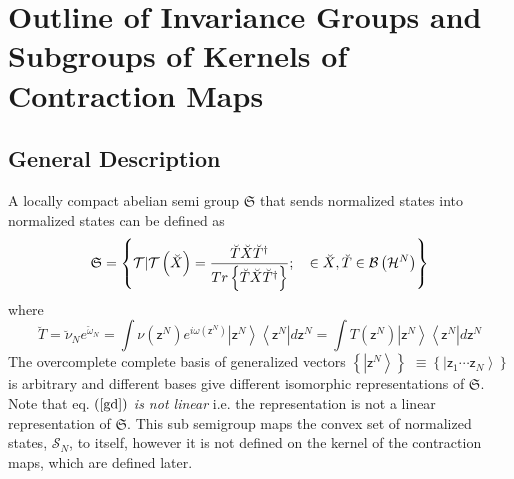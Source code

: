 \documentclass[aps,preprint]{revtex4}
\begin{document}
\section{Outline of Invariance Groups and Subgroups of Kernels of
Contraction Maps}

\subsection{General Description}

A locally compact abelian semi group $\mathfrak{S}$ that sends normalized
states into normalized states can be defined as 
\begin{equation}
\mathfrak{S}=\left\{ \mathcal{T}|\mathcal{T}\left( \breve{X}\right) =\frac{%
\breve{T}\breve{X}\breve{T}^{\dagger }}{Tr\left\{ \breve{T}\breve{X}\breve{T}%
^{\dagger }\right\} };\quad \in \breve{X},\breve{T}\in \mathcal{B}\left( 
\mathcal{H}^{N}\right) \right\}  \label{gd}
\end{equation}%
where 
\begin{equation}
\breve{T}=\breve{\nu}_{N}e^{\breve{\omega}_{N}}=\int \nu \left( \mathsf{z}%
^{N}\right) e^{i\omega \left( \mathsf{z}^{N}\right) }\left\vert \mathsf{z}%
^{N}\right\rangle \left\langle \mathsf{z}^{N}\right\vert d\mathsf{z}%
^{N}=\int T\left( \mathsf{z}^{N}\right) \left\vert \mathsf{z}%
^{N}\right\rangle \left\langle \mathsf{z}^{N}\right\vert d\mathsf{z}^{N}
\end{equation}%
The overcomplete complete basis of generalized vectors $\left\{ \left\vert 
\mathsf{z}^{N}\right\rangle \right\} $ $\equiv \left\{ \left\vert \mathsf{z}%
_{1}\cdots \mathsf{z}_{N}\right\rangle \right\} $ is arbitrary and different
bases give different isomorphic representations of $\mathfrak{S}$. Note that
eq. $\left( \ref{gd}\right) $ \emph{is not linear }i.e. the representation
is not a linear representation of $\mathfrak{S}$. This sub semigroup maps
the convex set of normalized states, $\mathcal{S}_{N}$, to itself, however
it is not defined on the kernel of the contraction maps, which are defined
later.
\end{document}
